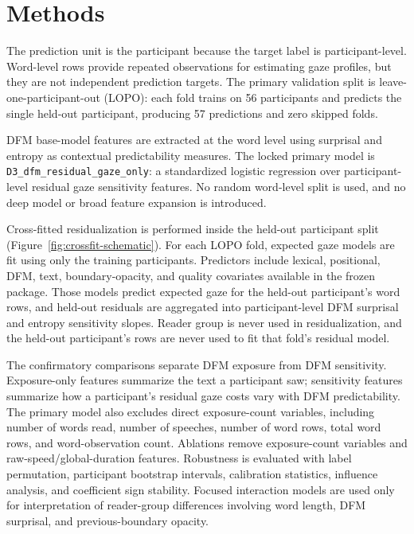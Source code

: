 \section{Methods}
The prediction unit is the participant because the target label is participant-level.
Word-level rows provide repeated observations for estimating gaze profiles, but they
are not independent prediction targets. The primary validation split is
leave-one-participant-out (LOPO): each fold trains on 56 participants and predicts the
single held-out participant, producing 57 predictions and zero skipped folds.

DFM base-model features are extracted at the word level using surprisal and entropy as
contextual predictability measures. The locked primary model is
\texttt{D3\_dfm\_residual\_gaze\_only}: a standardized logistic regression over
participant-level residual gaze sensitivity features. No random word-level split is
used, and no deep model or broad feature expansion is introduced.

Cross-fitted residualization is performed inside the held-out participant split
(Figure~\ref{fig:crossfit-schematic}). For each LOPO fold, expected gaze models are fit
using only the training participants. Predictors include lexical, positional, DFM, text,
boundary-opacity, and quality covariates available in the frozen package. Those models
predict expected gaze for the held-out participant's word rows, and held-out residuals
are aggregated into participant-level DFM surprisal and entropy sensitivity slopes.
Reader group is never used in residualization, and the held-out participant's rows are
never used to fit that fold's residual model.

The confirmatory comparisons separate DFM exposure from DFM sensitivity. Exposure-only
features summarize the text a participant saw; sensitivity features summarize how a
participant's residual gaze costs vary with DFM predictability. The primary model also
excludes direct exposure-count variables, including number of words read, number of
speeches, number of word rows, total word rows, and word-observation count. Ablations
remove exposure-count variables and raw-speed/global-duration features. Robustness is
evaluated with label permutation, participant bootstrap intervals, calibration
statistics, influence analysis, and coefficient sign stability. Focused interaction
models are used only for interpretation of reader-group differences involving word
length, DFM surprisal, and previous-boundary opacity.
